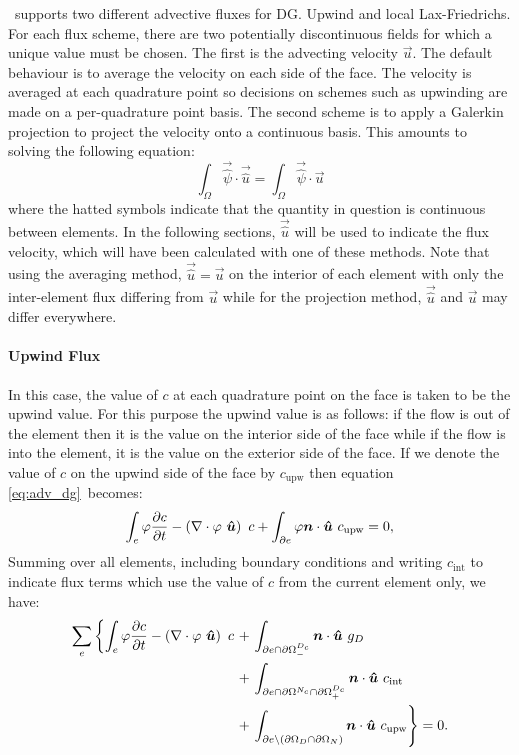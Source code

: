 \fluidity\ supports two different advective fluxes for DG. Upwind and local
Lax-Friedrichs. For each flux scheme, there are two potentially
discontinuous fields for which a unique value must be chosen. The first is
the advecting velocity $\vec{u}$. The default behaviour is to average the
velocity on each side of the face. The velocity is averaged at each
quadrature point so decisions on schemes such as upwinding are made on a
per-quadrature point basis. The second scheme is to apply a Galerkin
projection to project the velocity onto a continuous basis. This amounts to
solving the following equation:
\begin{equation}
  \int_\Omega \vec{\hat{\psi}} \cdot\vec{\hat{u}}
  = \int_\Omega \vec{\hat{\psi}}\cdot \vec{u}
\end{equation}
where the hatted symbols indicate that the quantity in question is
continuous between elements. In the following sections, $\vec{\hat{u}}$ will
be used to indicate the flux velocity, which will have been calculated with
one of these methods. Note that using the averaging method,
$\vec{\hat{u}}=\vec{u}$ on the interior of each element with only the inter-element
flux differing from $\vec{u}$ while for the projection method, $\vec{\hat
  u}$ and $\vec{u}$ may differ everywhere.

\paragraph{Upwind Flux}

In this case, the value of $c$ at each quadrature point on the face is taken
to be the upwind value. For this purpose the upwind value is as follows: if
the flow is out of the element then it is the value on the interior side of
the face while if the flow is into the element, it is the value on the
exterior side of the face. If we denote the value of $c$ on the upwind side
of the face by $c_{\mathrm{upw}}$ then equation \eqref{eq:adv_dg}\ becomes:
\begin{equation}
  \int_e \varphi \frac{\partial c}{\partial t} -
    \left(\nabla\cdot \varphi~{\mbox{\boldmath$\hat u$}}\right)~c +
    \int_{\partial e} \varphi{\mbox{\boldmath$n$}}\cdot{\mbox{\boldmath$\hat u$}}~c_{\mathrm{upw}}
    = 0,
\end{equation}
Summing over all elements, including boundary conditions and writing
$c_{\mathrm{int}}$ to indicate flux terms which use the value of $c$ from the
current element only, we have:
\begin{equation}
  \begin{split}
    \sum_e \left\{ \int_e \varphi \frac{\partial c}{\partial t}
    - \left(\nabla\cdot \varphi~{\mbox{\boldmath$\hat u$}}\right)~c \right.
    &+ \left. \int_{\partial e \cap\partial\Omega^{D_c}_-} {\mbox{\boldmath$n$}}\cdot{\mbox{\boldmath$\hat u$}}~g_D \right. \\
    &+ \left. \int_{\partial e \cap\partial\Omega^{N_c}\cap\partial\Omega^{D_c}_+} {\mbox{\boldmath$n$}}\cdot{\mbox{\boldmath$\hat u$}}~c_{\mathrm{int}} \right. \\
    &+ \left. \int_{\partial e\setminus (\partial\Omega_D\cap\partial\Omega_N)}
    {\mbox{\boldmath$n$}}\cdot{\mbox{\boldmath$\hat u$}}~c_{\mathrm{upw}} \right\} =0.
    \label{eq:dg_adv_diff_integrated_once}
  \end{split}
\end{equation}

